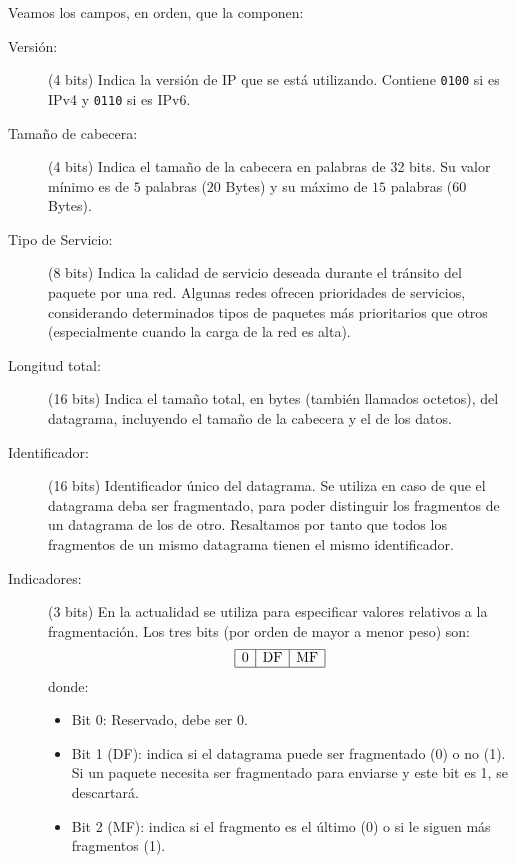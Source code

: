 Veamos los campos, en orden, que la componen:
\begin{description}
    \item[Versión:] (4 bits) Indica la versión de \acrshort{IP} que se está utilizando. Contiene \verb|0100| si es \acrshort{IPv4} y \verb|0110| si es \acrshort{IPv6}.
    \item[Tamaño de cabecera:] (4 bits) Indica el tamaño de la cabecera en palabras de 32 bits. Su valor mínimo es de $5$ palabras ($20$ Bytes) y su máximo de $15$ palabras ($60$ Bytes).
    \item[Tipo de Servicio:] (8 bits) Indica la calidad de servicio deseada durante el tránsito del paquete por una red. Algunas redes ofrecen prioridades de servicios, considerando determinados tipos de paquetes más prioritarios que otros (especialmente cuando la carga de la red es alta).
    \item[Longitud total:] (16 bits) Indica el tamaño total, en bytes (también llamados octetos), del datagrama, incluyendo el tamaño de la cabecera y el de los datos.
    \item[Identificador:] (16 bits) Identificador único del datagrama. Se utiliza en caso de que el datagrama deba ser fragmentado, para poder distinguir los fragmentos de un datagrama de los de otro. Resaltamos por tanto que todos los fragmentos de un mismo datagrama tienen el mismo identificador.
    \item[Indicadores:] (3 bits) En la actualidad se utiliza para especificar valores relativos a la fragmentación. Los tres bits (por orden de mayor a menor peso) son:
    \begin{equation*}
        \begin{array}{|c|c|c|}
            \hline
            0 & \text{DF} & \text{MF} \\ \hline
        \end{array}
    \end{equation*}
    donde:
        \begin{itemize}
            \item Bit 0: Reservado, debe ser 0.
            \item Bit 1 (\acrfull{DF}): indica si el datagrama puede ser fragmentado (0) o no (1). Si un paquete necesita ser fragmentado para enviarse y este bit es 1, se descartará.
            \item Bit 2 (\acrfull{MF}): indica si el fragmento es el último (0) o si le siguen más fragmentos (1).
        \end{itemize}


\end{description}
